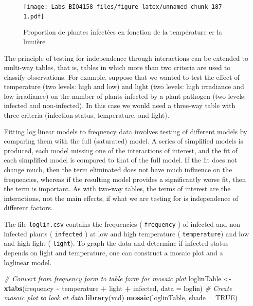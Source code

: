 \documentclass[
  12pt,
]{book}
\newenvironment{Shaded}{\begin{snugshade}}{\end{snugshade}}
\newcommand{\CommentTok}[1]{\textcolor[rgb]{0.56,0.35,0.01}{\textit{#1}}}
\newcommand{\DataTypeTok}[1]{\textcolor[rgb]{0.13,0.29,0.53}{#1}}
\newcommand{\KeywordTok}[1]{\textcolor[rgb]{0.13,0.29,0.53}{\textbf{#1}}}
\newcommand{\NormalTok}[1]{#1}
\newcommand{\OperatorTok}[1]{\textcolor[rgb]{0.81,0.36,0.00}{\textbf{#1}}}
\newcommand{\OtherTok}[1]{\textcolor[rgb]{0.56,0.35,0.01}{#1}}
\newcommand{\StringTok}[1]{\textcolor[rgb]{0.31,0.60,0.02}{#1}}
\begin{document}
\begin{figure}
\centering
\texttt{[image: Labs\_BIO4158\_files/figure-latex/unnamed-chunk-187-1.pdf]}
\caption{\label{fig:unnamed-chunk-187}Proportion de plantes infectées en fonction de la température er la lumière}
\end{figure}

The principle of testing for independence through interactions can be extended to multi-way tables, that is, tables in which more than two criteria are used to classify observations. For example, suppose that we wanted to test the effect of temperature (two levels: high and low) and light (two levels: high irradiance and low irradiance) on the number of plants infected by a plant pathogen (two levels: infected and non-infected). In this case we would need a three-way table with three criteria (infection status, temperature, and light).

Fitting log linear models to frequency data involves testing of different models by comparing them with the full (saturated) model. A series of simplified models is produced, each model missing one of the interactions of interest, and the fit of each simplified model is compared to that of the full model. If the fit does not change much, then the term eliminated does not have much influence on the frequencies, whereas if the resulting model provides a significantly worse fit, then the term is important. As with two-way tables, the terms of interest are the interactions, not the main effects, if what we are testing for is independence of different factors.

The file \texttt{loglin.csv} contains the frequencies ( \texttt{frequency} ) of infected and non-infected plants ( \texttt{infected} ) at low and high temperature ( \texttt{temperature}) and low and high light ( \texttt{light}). To graph the data and determine if infected status depends on light and temperature, one can construct a mosaic plot and a loglinear model.

\begin{Shaded}
\begin{Highlighting}[]
\CommentTok{\# Convert from frequency form to table form for mosaic plot}
\NormalTok{loglinTable \textless{}{-}}\StringTok{ }\KeywordTok{xtabs}\NormalTok{(frequency }\OperatorTok{\textasciitilde{}}\StringTok{ }\NormalTok{temperature }\OperatorTok{+}\StringTok{ }\NormalTok{light }\OperatorTok{+}\StringTok{ }\NormalTok{infected, }\DataTypeTok{data =}\NormalTok{ loglin)}
\CommentTok{\# Create mosaic plot to look at data}
\KeywordTok{library}\NormalTok{(vcd)}
\KeywordTok{mosaic}\NormalTok{(loglinTable, }\DataTypeTok{shade =} \OtherTok{TRUE}\NormalTok{)}
\end{Highlighting}
\end{Shaded}
\end{document}
